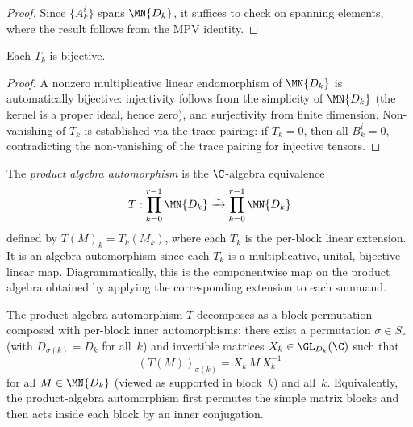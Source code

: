 \begin{proof}\leanok{}
    Since $\{A_k^i\}$ spans $\MN{D_k}$, it suffices to check on spanning
    elements, where the result follows from the MPV identity.
\end{proof}

\begin{lemma}%
    \label{lem:perBlockLinearExtension_bijective}
    \leanok
    Each $T_k$ is bijective.
\end{lemma}

\begin{proof}\leanok{}
    A nonzero multiplicative linear endomorphism of $\MN{D_k}$ is
    automatically bijective: injectivity follows from the simplicity
    of $\MN{D_k}$ (the kernel is a proper ideal, hence zero), and
    surjectivity from finite dimension.
    Non-vanishing of $T_k$ is established via the trace pairing: if
    $T_k = 0$, then all $B_k^i = 0$, contradicting the non-vanishing
    of the trace pairing for injective tensors.
\end{proof}

\begin{definition}%
    \label{def:piAlgEquiv}
    \leanok
    The \emph{product algebra automorphism} is the $\C$-algebra
    equivalence
    \[
        T : \prod_{k=0}^{r-1} \MN{D_k}
        \xrightarrow{ \sim }
        \prod_{k=0}^{r-1} \MN{D_k}
    \]
    defined by $T(M)_k = T_k(M_k)$, where each $T_k$ is the per-block
    linear extension.
    It is an algebra automorphism since each $T_k$ is a multiplicative,
    unital, bijective linear map.
    Diagrammatically, this is the componentwise map on the product algebra
    obtained by applying the corresponding extension to each summand.
\end{definition}

\begin{theorem}%
    \label{thm:piAlgEquiv_decomposition}
    \leanok
    The product algebra automorphism $T$ decomposes as a block
    permutation composed with per-block inner automorphisms: there exist
    a permutation $\sigma \in S_r$ (with $D_{\sigma(k)} = D_k$ for
    all~$k$) and invertible matrices $X_k \in \GL_{D_k}(\C)$ such that
    \[
        (T(M))_{\sigma(k)} = X_k\, M\, X_k^{-1}
    \]
    for all $M \in \MN{D_k}$ (viewed as supported in block~$k$) and
    all~$k$.
    Equivalently, the product-algebra automorphism first permutes the
    simple matrix blocks and then acts inside each block by an inner
    conjugation.
\end{theorem}

